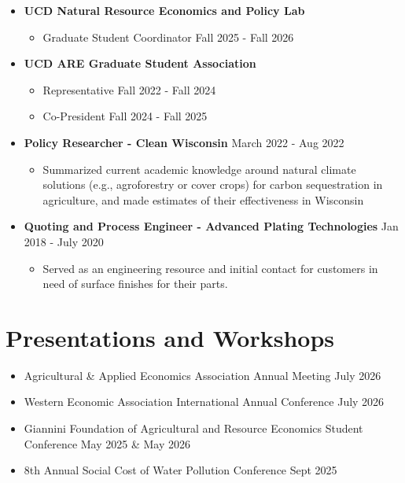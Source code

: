 \documentclass{article}[12]
\begin{document}
\begin{itemize}[itemsep=0.75em]
    \item \textbf{UCD Natural Resource Economics and Policy Lab}
        \begin{itemize}
            \item Graduate Student Coordinator \hfill Fall 2025 - Fall 2026
        \end{itemize}
    
    \item \textbf{UCD ARE Graduate Student Association}
    \begin{itemize}
        \item Representative \hfill Fall 2022 - Fall 2024
        \item Co-President \hfill Fall 2024 - Fall 2025
    \end{itemize}

   \item \textbf{Policy Researcher - Clean Wisconsin} \hfill March 2022 - Aug 2022
    \begin{itemize}
        \item  Summarized current academic knowledge around natural climate solutions (e.g., agroforestry or cover crops) for carbon sequestration in agriculture, and made estimates of their effectiveness in Wisconsin
    \end{itemize}
    
    \item \textbf{Quoting and Process Engineer - Advanced Plating Technologies} \hfill Jan 2018 - July 2020
    \begin{itemize}
        \item Served as an engineering resource and initial contact for customers in need of surface finishes for their parts.  
    \end{itemize}

\end{itemize}

\section{Presentations and Workshops}
\begin{itemize}
    \item Agricultural \& Applied Economics Association Annual Meeting \hfill July 2026 
    \item Western Economic Association International Annual Conference \hfill July 2026
    \item Giannini Foundation of Agricultural and Resource Economics Student Conference \hfill May 2025 \& May 2026
    \item 8th Annual Social Cost of Water Pollution Conference \hfill Sept 2025
\end{itemize}
\end{document}

